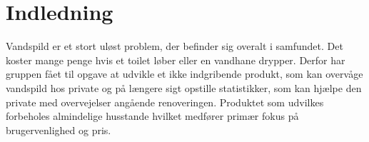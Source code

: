 \section{Indledning}
Vandspild er et stort uløst problem, der befinder sig overalt i samfundet. Det koster mange penge hvis et toilet løber eller en vandhane drypper. Derfor har gruppen fået til opgave at udvikle et ikke indgribende produkt, som kan overvåge vandspild hos private og på længere sigt opstille statistikker, som kan hjælpe den private med overvejelser angående renoveringen. Produktet som udvilkes forbeholes almindelige husstande hvilket medfører primær fokus på brugervenlighed og pris.

